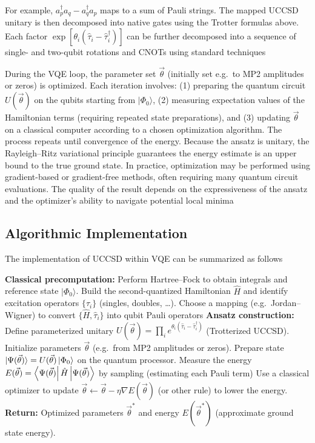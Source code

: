 \documentclass[twocolumn,superscriptaddress,unsortedaddress,nofootinbib,amsmath,amssymb,
aps,floatfix]{revtex4-2}
\begin{document}
For example, $a^\dagger_p a_q - a^\dagger_q a_p$ maps to a sum of
Pauli strings.  The mapped UCCSD unitary is then decomposed into
native gates using the Trotter formulas above.  Each factor
$\exp[\theta_i(\hat\tau_i-\hat\tau_i^\dagger)]$ can be further
decomposed into a sequence of single- and two-qubit rotations and
CNOTs using standard techniques


During the VQE loop, the parameter set $\vec\theta$ (initially set
e.g.\ to MP2 amplitudes or zeros) is optimized.  Each iteration
involves: (1) preparing the quantum circuit $U(\vec\theta)$ on the
qubits starting from $|\Phi_0\rangle$, (2) measuring expectation
values of the Hamiltonian terms (requiring repeated state
preparations), and (3) updating $\vec\theta$ on a classical computer
according to a chosen optimization algorithm.  The process repeats
until convergence of the energy.  Because the ansatz is unitary, the
Rayleigh–Ritz variational principle guarantees the energy estimate is
an upper bound to the true ground state.  In practice, optimization
may be performed using gradient-based or gradient-free methods, often
requiring many quantum circuit evaluations.  The quality of the result
depends on the expressiveness of the ansatz and the optimizer’s
ability to navigate potential local minima


\subsection{Algorithmic Implementation}
The implementation of UCCSD within VQE can be summarized as follows 

\begin{algorithm}[H]
\caption{VQE with UCCSD Ansatz}
\begin{algorithmic}[1]
\State \textbf{Classical precomputation:} Perform Hartree--Fock to obtain integrals and reference state $|\Phi_0\rangle$.
\State Build the second-quantized Hamiltonian $\hat H$ and identify excitation operators $\{\hat\tau_i\}$ (singles, doubles, \dots).
\State Choose a mapping (e.g.\ Jordan–Wigner) to convert $\{\hat H,\hat\tau_i\}$ into qubit Pauli operators
\State \textbf{Ansatz construction:} Define parameterized unitary $U(\vec\theta)=\prod_i e^{\theta_i(\hat\tau_i - \hat\tau_i^\dagger)}$ (Trotterized UCCSD).
\State Initialize parameters $\vec\theta$ (e.g.\ from MP2 amplitudes or zeros).
\Repeat
    \State Prepare state $|\Psi(\vec\theta)\rangle = U(\vec\theta)\ket{\Phi_0}$ on the quantum processor.
    \State Measure the energy $E(\vec\theta) = \bra{\Psi(\vec\theta)}\hat H\ket{\Psi(\vec\theta)}$ by sampling (estimating each Pauli term)
    \State Use a classical optimizer to update $\vec\theta \leftarrow \vec\theta - \eta \nabla E(\vec\theta)$ (or other rule) to lower the energy.
\State \textbf{Return:} Optimized parameters $\vec\theta^*$ and energy $E(\vec\theta^*)$ (approximate ground state energy).
\end{algorithmic}
\end{algorithm}
\end{document}
